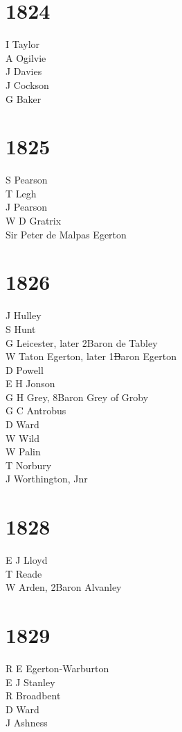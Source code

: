 \begin{multicols}{2}
  \section*{1824}
  I Taylor \\
  A Ogilvie \\
  J Davies \\
  J Cockson \\
  G Baker \\
  \section*{1825}
  S Pearson \\
  T Legh \\
  J Pearson \\
  W D Gratrix \\
  Sir Peter de Malpas Egerton \\
  \section*{1826}
  J Hulley \\
  S Hunt \\
  G Leicester, later 2\nd Baron de Tabley \\
  W Taton Egerton, later 1\st Baron Egerton \\
  D Powell \\
  E H Jonson \\
  G H Grey, 8\nth Baron Grey of Groby \\
  G C Antrobus \\
  D Ward \\
  W Wild \\
  W Palin \\
  T Norbury \\
  J Worthington, Jnr \\
  \section*{1828}
  E J Lloyd \\
  T Reade \\
  W Arden, 2\nd Baron Alvanley \\
  \section*{1829}
  R E Egerton-Warburton \\
  E J Stanley \\
  R Broadbent \\
  D Ward \\
  J Ashness \\

\end{multicols}
